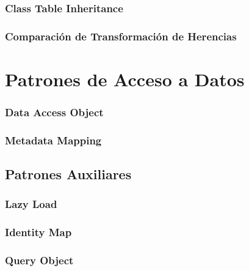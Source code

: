 \documentclass[a4paper,slidestop,xcolor=pst,blue]{beamer}
\begin{document}
\subsubsection{Class Table Inheritance}

\subsubsection{Comparación de Transformación de Herencias}

\section{Patrones de Acceso a Datos}

\subsubsection{Data Access Object}

\subsubsection{Metadata Mapping}

\subsection{Patrones Auxiliares}

\subsubsection{Lazy Load}

\subsubsection{Identity Map}

\subsubsection{Query Object}
\end{document}
